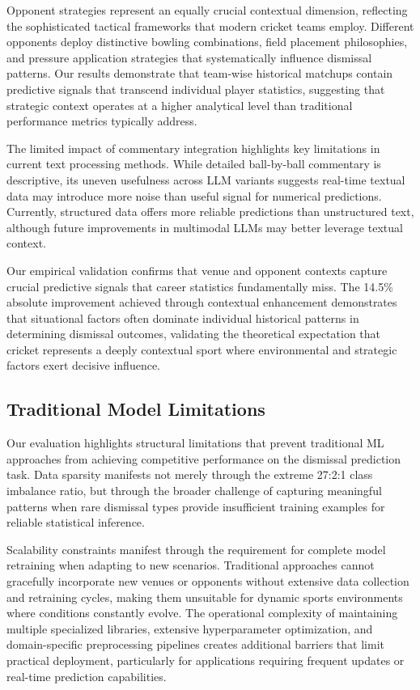 \documentclass[sigconf,anonymous,review]{acmart}
\begin{document}
Opponent strategies represent an equally crucial contextual dimension, reflecting the sophisticated tactical frameworks that modern cricket teams employ. Different opponents deploy distinctive bowling combinations, field placement philosophies, and pressure application strategies that systematically influence dismissal patterns. Our results demonstrate that team-wise historical matchups contain predictive signals that transcend individual player statistics, suggesting that strategic context operates at a higher analytical level than traditional performance metrics typically address.

The limited impact of commentary integration highlights key limitations in current text processing methods. While detailed ball-by-ball commentary is descriptive, its uneven usefulness across LLM variants suggests real-time textual data may introduce more noise than useful signal for numerical predictions. Currently, structured data offers more reliable predictions than unstructured text, although future improvements in multimodal LLMs may better leverage textual context.

Our empirical validation confirms that venue and opponent contexts capture crucial predictive signals that career statistics fundamentally miss. The 14.5\% absolute improvement achieved through contextual enhancement demonstrates that situational factors often dominate individual historical patterns in determining dismissal outcomes, validating the theoretical expectation that cricket represents a deeply contextual sport where environmental and strategic factors exert decisive influence.

\subsection{Traditional Model Limitations}

Our evaluation highlights structural limitations that prevent traditional ML approaches from achieving competitive performance on the dismissal prediction task. Data sparsity manifests not merely through the extreme 27:2:1 class imbalance ratio, but through the broader challenge of capturing meaningful patterns when rare dismissal types provide insufficient training examples for reliable statistical inference.

Scalability constraints manifest through the requirement for complete model retraining when adapting to new scenarios. Traditional approaches cannot gracefully incorporate new venues or opponents without extensive data collection and retraining cycles, making them unsuitable for dynamic sports environments where conditions constantly evolve. The operational complexity of maintaining multiple specialized libraries, extensive hyperparameter optimization, and domain-specific preprocessing pipelines creates additional barriers that limit practical deployment, particularly for applications requiring frequent updates or real-time prediction capabilities.
\end{document}
